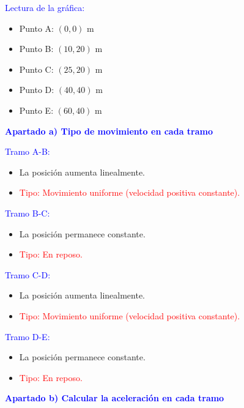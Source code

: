 \begin{exercise}
\begin{solu}
        \vspace{0.3cm}

        \textcolor{blue}{Lectura de la gráfica:}
        \begin{itemize}
            \item Punto A: $(0,0)$ m
            \item Punto B: $(10,20)$ m
            \item Punto C: $(25,20)$ m
            \item Punto D: $(40,40)$ m
            \item Punto E: $(60,40)$ m
        \end{itemize}

        \textbf{\textcolor{blue}{Apartado a) Tipo de movimiento en cada tramo}}

        \textcolor{blue}{Tramo A-B:}
        \begin{itemize}
            \item La posición aumenta linealmente.
            \item \textcolor{red}{Tipo: Movimiento uniforme (velocidad positiva constante).}
        \end{itemize}

        \textcolor{blue}{Tramo B-C:}
        \begin{itemize}
            \item La posición permanece constante.
            \item \textcolor{red}{Tipo: En reposo.}
        \end{itemize}

        \textcolor{blue}{Tramo C-D:}
        \begin{itemize}
            \item La posición aumenta linealmente.
            \item \textcolor{red}{Tipo: Movimiento uniforme (velocidad positiva constante).}
        \end{itemize}

        \textcolor{blue}{Tramo D-E:}
        \begin{itemize}
            \item La posición permanece constante.
            \item \textcolor{red}{Tipo: En reposo.}
        \end{itemize}

        \vspace{0.5cm}

        \textbf{\textcolor{blue}{Apartado b) Calcular la aceleración en cada tramo}}


\end{solu}
\end{exercise}
